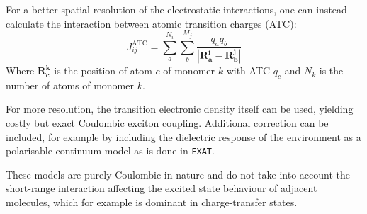 For a better spatial resolution of the electrostatic interactions, one can instead calculate the interaction between atomic transition charges (ATC)\cite{Spano2016}:
\begin{equation}
J_{ij}^{\text{ATC}} = \sum_a^{N_i}\sum_b^{M_j} \frac{q_a q_b}{|\bm{R_a^i} - \bm{R_b^j}|}
\label{eq:atc}
\end{equation}
Where $\bm{R_c^k}$ is the position of atom $c$ of monomer $k$ with ATC $q_c$ and $N_k$ is the number of atoms of monomer $k$.

For more resolution, the transition electronic density itself can be used, yielding costly but exact Coulombic exciton coupling. Additional correction can be included, for example by including the dielectric response of the environment as a polarisable continuum model as is done in \texttt{EXAT}.\cite{Jurinovich2018}

These models are purely Coulombic in nature and do not take into account the short-range interaction affecting the excited state behaviour of adjacent molecules, which for example is dominant in charge-transfer states.

